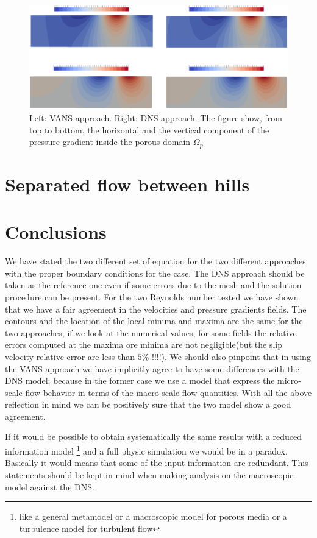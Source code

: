\begin{figure}[h]
	\centering
	\includegraphics[width=1\linewidth]{chapter_5/figure/re1000/vans_p}
	\caption{Left: VANS approach. Right: DNS approach. The figure show, from top to bottom, the horizontal and the vertical component of the pressure gradient inside the porous domain $\Omega_p$}
	\label{fig:1000_p}
\end{figure}


\section{Separated flow between hills}




\section{Conclusions}

We have stated the two different set of equation for the two different approaches with the proper boundary conditions for the case.
The DNS approach should be taken as the reference one even if some errors due to the mesh and the solution procedure can be present.
For the two Reynolds number tested we have shown that we have a fair agreement in the velocities and pressure gradients fields.
The contours and the location of the local minima and maxima are the same for the two approaches; if we look at the numerical values, for some fields the relative errors computed at the maxima ore minima are not negligible(but the slip velocity relative error are less than $5\%$ !!!!).
We should also pinpoint that in using the VANS approach we have implicitly agree to have some differences with the DNS model; because in the former case we use a model that express the micro-scale flow behavior in terms of the macro-scale flow quantities.
With all the above reflection in mind we can be positively sure that the two model show a good agreement.

If it would be possible to obtain systematically the same results with a reduced information model \footnote{like a general metamodel or a macroscopic model for porous media or a turbulence model for turbulent flow} and a full physic simulation we would be in a paradox. Basically it would means that some of the input information are redundant. This statements should be kept in mind when making analysis on the macroscopic model against the DNS.



